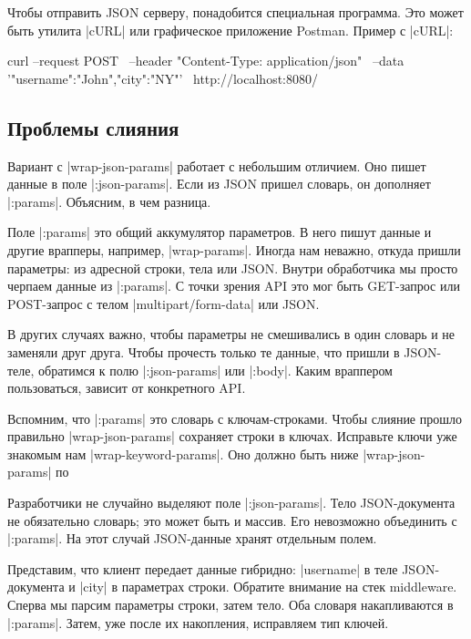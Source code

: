 Чтобы отправить JSON серверу, понадобится специальная программа. Это
может быть утилита \spverb|cURL| или графическое приложение Postman. Пример с \spverb|cURL|:

\begin{english}
  \begin{bash}
curl --request POST \
     --header "Content-Type: application/json" \
     --data '{"username":"John","city":"NY"}' \
     http://localhost:8080/
  \end{bash}
\end{english}

\subsection{Проблемы слияния}

Вариант с \spverb|wrap-json-params| работает с небольшим отличием. Оно пишет
данные в поле \spverb|:json-params|. Если из JSON пришел словарь, он дополняет
\spverb|:params|. Объясним, в чем разница.

Поле \spverb|:params| это общий аккумулятор параметров. В него пишут данные и
другие врапперы, например, \spverb|wrap-params|. Иногда нам неважно, откуда
пришли параметры: из адресной строки, тела или JSON. Внутри обработчика мы
просто черпаем данные из \spverb|:params|. С точки зрения API это мог быть
GET-запрос или POST-запрос с телом \spverb|multipart/form-data| или JSON.

В других случаях важно, чтобы параметры не смешивались в один словарь и не
заменяли друг друга. Чтобы прочесть только те данные, что пришли в JSON-теле,
обратимся к полю \spverb|:json-params| или \spverb|:body|. Каким враппером
пользоваться, зависит от конкретного API.

Вспомним, что \spverb|:params| это словарь с ключам-строками. Чтобы слияние
прошло правильно \spverb|wrap-json-params| сохраняет строки в ключах. Исправьте
ключи уже знакомым нам \spverb|wrap-keyword-params|. Оно должно быть ниже
\spverb|wrap-json-params| по

Разработчики не случайно выделяют поле \spverb|:json-params|. Тело
JSON-документа не обязательно словарь; это может быть и массив. Его невозможно
объединить с \spverb|:params|. На этот случай JSON-данные хранят отдельным
полем.

Представим, что клиент передает данные гибридно: \spverb|username| в теле
JSON-документа и \spverb|city| в параметрах строки. Обратите внимание на стек
middleware. Сперва мы парсим параметры строки, затем тело. Оба словаря
накапливаются в \spverb|:params|. Затем, уже после их накопления, исправляем тип
ключей.

